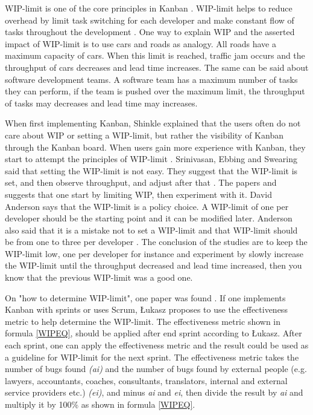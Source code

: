 \documentclass[UKenglish]{ifimaster}  %
\begin{document}
WIP-limit is one of the core principles in Kanban \parencite{6068363}. WIP-limit helps to reduce overhead by limit task switching for each developer and make constant flow of tasks throughout the development \parencite{DavidAnderson}. One way to explain WIP and the asserted impact of WIP-limit is to use cars and roads as analogy. All roads have a maximum capacity of cars. When this limit is reached, traffic jam occurs and the throughput of cars decreases and lead time increases. The same can be said about software development teams. A software team has a maximum number of tasks they can perform, if the team is pushed over the maximum limit, the throughput of tasks may decreases and lead time may increases.

When first implementing Kanban, Shinkle explained that the users often do not care about WIP or setting a WIP-limit, but rather the visibility of Kanban through the Kanban board. When users gain more experience with Kanban, they start to attempt the principles of WIP-limit \parencite{Shinkle}. Srinivasan, Ebbing and Swearing said that setting the WIP-limit is not easy. They suggest that the WIP-limit is set, and then observe throughput, and adjust after that . The papers \parencite{Kniberg} and \parencite{Ikonen} suggests that one start by limiting WIP, then experiment with it. David Anderson says that the WIP-limit is a policy choice. A WIP-limit of one per developer should be the starting point and it can be modified later. Anderson also said that it is a mistake not to set a WIP-limit and that WIP-limit should be from one to three per developer \parencite{0984521402}. The conclusion of the studies are to keep the WIP-limit low, one per developer for instance and experiment by slowly increase the WIP-limit until the throughput decreased and lead time increased, then you know that the previous WIP-limit was a good one.

On "how to determine WIP-limit", one paper was found \parencite{Sienkiewicz}. If one implements Kanban with sprints or uses Scrum, \L ukasz proposes to use the effectiveness metric to help determine the WIP-limit. The effectiveness metric shown in formula \ref{WIPEQ}, should be applied after end sprint according to \L ukasz. After each sprint, one can apply the effectiveness metric and the result could be used as a guideline for WIP-limit for the next sprint. The effectiveness metric takes the number of bugs found \textit{(ai)} and the number of bugs found by external people (e.g. lawyers, accountants, coaches, consultants, translators, internal and external service providers etc.) \textit{(ei)}, and minus \textit{ai} and \textit{ei}, then divide the result by \textit{ai} and multiply it by 100\%  as shown in formula \ref{WIPEQ}. 
\end{document}
